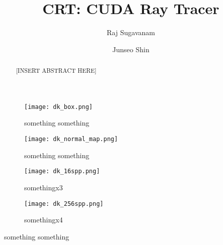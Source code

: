 \documentclass[sigconf, screen]{acmart}
\begin{document}
\title{CRT: CUDA Ray Tracer}

\author{Raj Sugavanam}
\author{Junseo Shin}

\begin{abstract}
    [INSERT ABSTRACT HERE]
\end{abstract}

\begin{teaserfigure}
    \centering
    \begin{subfigure}{0.24\textwidth}
        \centering
        \texttt{[image: dk\_box.png]}
        \caption{something something}
        \label{fig:teaser1}
    \end{subfigure}
    \begin{subfigure}{0.24\textwidth}
        \centering
        \texttt{[image: dk\_normal\_map.png]}
        \caption{something something}
        \label{fig:teaser2}
    \end{subfigure}
    \begin{subfigure}{0.24\textwidth}
        \centering
        \texttt{[image: dk\_16spp.png]}
        \caption{somethingx3}
        \label{fig:teaser3}
    \end{subfigure}
    \begin{subfigure}{0.24\textwidth}
        \centering
        \texttt{[image: dk\_256spp.png]}
        \caption{somethingx4}
        \label{fig:teaser4}
    \end{subfigure}
    \caption{something something}
    \label{fig:teaser}
\end{teaserfigure}

\maketitle




\nocite{*}


\end{document}
